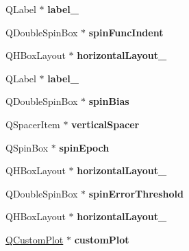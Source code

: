 \begin{DoxyCompactItemize}
\item 
\mbox{\label{class_ui___main_form_ae026b44ff7a12abddd1fe0e394b4bf83}} 
Q\+Label $\ast$ {\bfseries label\+\_}
\item 
\mbox{\label{class_ui___main_form_af06eaba4c0817fb9403d1293f1cf8912}} 
Q\+Double\+Spin\+Box $\ast$ {\bfseries spin\+Func\+Indent}
\item 
\mbox{\label{class_ui___main_form_a4a5392ab826e43cf2eab2a3220393637}} 
Q\+H\+Box\+Layout $\ast$ {\bfseries horizontal\+Layout\+\_}
\item 
\mbox{\label{class_ui___main_form_a861ad58dcbea320e59a11d26791d9a8d}} 
Q\+Label $\ast$ {\bfseries label\+\_}
\item 
\mbox{\label{class_ui___main_form_ac9f44f7faeb02c4a835734bfc006f41f}} 
Q\+Double\+Spin\+Box $\ast$ {\bfseries spin\+Bias}
\item 
\mbox{\label{class_ui___main_form_a87a4d60f1665221e7584e458c1db1584}} 
Q\+Spacer\+Item $\ast$ {\bfseries vertical\+Spacer}
\item 
\mbox{\label{class_ui___main_form_a54a53a1b5076a47dc1f6c5fc9be91aa0}} 
Q\+Spin\+Box $\ast$ {\bfseries spin\+Epoch}
\item 
\mbox{\label{class_ui___main_form_ac4231a852f6c4a39c90abbe1c243ce0c}} 
Q\+H\+Box\+Layout $\ast$ {\bfseries horizontal\+Layout\+\_}
\item 
\mbox{\label{class_ui___main_form_a679b6226bef812630ca5e637741b1d4b}} 
Q\+Double\+Spin\+Box $\ast$ {\bfseries spin\+Error\+Threshold}
\item 
\mbox{\label{class_ui___main_form_aef3cc79ae91ba9f0e1493c812d9699ed}} 
Q\+H\+Box\+Layout $\ast$ {\bfseries horizontal\+Layout\+\_}
\item 
\mbox{\label{class_ui___main_form_a181ace80fbc09e4469623e4070ab5a41}} 
\hyperlink{class_q_custom_plot}{Q\+Custom\+Plot} $\ast$ {\bfseries custom\+Plot}

\end{DoxyCompactItemize}
